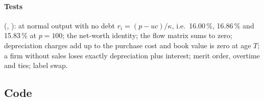 \paragraph{Tests} (, ): at
normal output with no debt $r_i = (p - uc)/\kappa$, i.e.\ 16.00\,\%, 16.86\,\% and 15.83\,\%
at $p = 100$; the net-worth identity; the flow matrix sums to zero; depreciation charges add
up to the purchase cost and book value is zero at age $T$; a firm without sales loses
exactly depreciation plus interest; merit order, overtime and ties; label swap.

\subsection*{Code}
